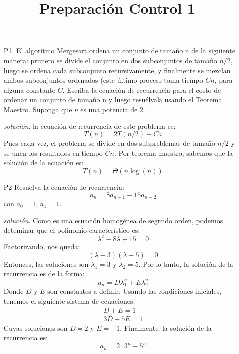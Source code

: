 \documentclass[dcc]{fcfmcourse}
\title{Preparación Control 1}
\begin{document}
\maketitle

\vspace{-1ex}

\begin{itemize}
\item[P1.] El algoritmo Mergesort ordena un conjunto de tamaño n de la siguiente manera: primero se divide el conjunto en dos subconjuntos de tamaño $n/2$, luego se ordena cada subconjunto recursivamente, y finalmente se mezclan ambos subconjuntos ordenados (este último proceso toma tiempo $Cn$, para alguna constante $C$. Escriba la ecuación de recurrencia para el costo de ordenar un conjunto de tamaño n y luego resuélvala usando el Teorema Maestro. Suponga que $n$ es una potencia de $2$.

\item[\textit{solución}.] la ecuación de recurrencia de este problema es:
\begin{equation}
T(n) = 2T(n/2) + Cn
\end{equation}
Pues cada vez, el problema se divide en dos subproblemas de tamaño $n/2$ y se unen los resultados en tiempo $Cn$.
Por teorema maestro, sabemos que la solución de la ecuación es:
\begin{equation}
T(n) = \Theta(n\log(n))
\end{equation}

\item[P2] Resuelva la ecuación de recurrencia:
\begin{equation}
a_n = 8a_{n −1} − 15a_{n −2}
\end{equation}
con $a_0 = 1$, $a_1 = 1$.

\item[\textit{solución}.] Como es una ecuación homogénea de segundo orden, podemos deteminar que el polinomio característico es:
\begin{equation}
\lambda^2 - 8\lambda + 15 = 0
\end{equation}
Factorizando, nos queda:
\begin{equation}
(\lambda - 3)(\lambda - 5) = 0
\end{equation}
Entonces, las soluciones son $\lambda_1 = 3$ y $\lambda_2 = 5$. Por lo tanto, la solución de la recurrencia es de la forma:
\begin{equation}
a_n = D\lambda_1^n + E\lambda_2^n
\end{equation}
Donde $D$ y $E$ son constantes a definir. Usando las condiciones iniciales, tenemos el siguiente sistema de ecuaciones:
\begin{align*}
D + E = 1\\
3D + 5E = 1
\end{align*}
Cuyas soluciones son $D = 2$ y $E = -1$. Finalmente, la solución de la recurrencia es:
\begin{equation}
a_n = 2\cdot 3^n - 5^n
\end{equation}



\end{itemize}
\end{document}
